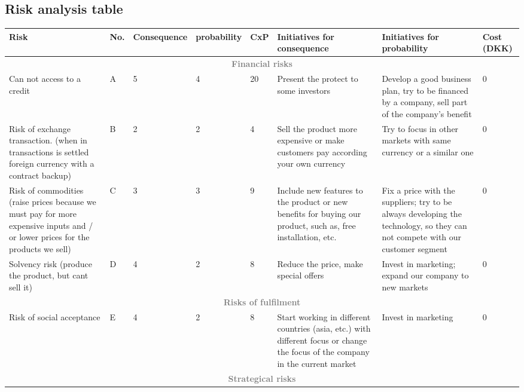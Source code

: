 \begin{landscape}
\section{Risk analysis table}

\begin{table}[h!]
\centering
\scriptsize
\begin{tabular}[0.8\textswidth]{|p{5cm} |p{1cm} |p{2cm} |p{2cm} |p{1cm} |p{2.8cm} |p{2.8cm} |p{2cm}|}
\hline
Risk 										&No.& Consequence	& probability	& CxP	& Initiatives \newline for consequence	& Initiatives \newline for probability	& 	Cost (DKK) \\
\hline
\multicolumn{8}{|c|}{\normalsize{\textcolor{gray}{\textbf{Financial risks}}}}\\
\hline
Can not access to a credit					& A	& 5				&	4			& 20	& Present the protect to some investors	& Develop a good business plan, try to be financed by a company, sell part of the company's benefit	& 0\\
\hline
Risk of exchange transaction. 
(when in transactions is settled 
foreign currency with a contract backup)	& B	& 2				& 2				&  4	& Sell the product more expensive or make customers pay according your own currency
 &	Try to focus in other markets with same currency or a similar one &  0\\
\hline
Risk of commodities (raise prices because 
we  must pay for more expensive  inputs and
 / or lower prices for the products we sell)& C	& 3				& 3				& 9		& Include new features to the product or new benefits for buying our product, such as, free installation, etc.
 & Fix a price with the suppliers; try to be always developing the technology, so they can not compete with our customer segment & 0 \\
\hline
Solvency risk (produce the product, but cant sell it)	& D	& 4				& 2				& 8		& Reduce the price, make special offers & Invest in marketing; expand our company to new markets & 0 \\
\hline
\multicolumn{8}{|c|}{\normalsize{\textcolor{gray}{\textbf{Risks of fulfilment}}}}\\
\hline
Risk of social acceptance & E & 4 &  2 & 8 & Start working in different countries (asia, etc.) with different focus or change the focus of the company in the current market
& Invest in marketing &0 \\
\hline
\multicolumn{8}{|c|}{\normalsize{\textcolor{gray}{\textbf{Strategical risks}}}}\\

\end{tabular}
\end{table}
\end{landscape}
